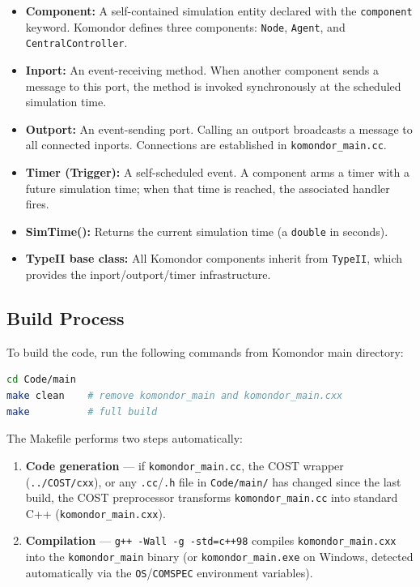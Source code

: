 \documentclass[11pt,a4paper]{article}
\begin{document}
\begin{itemize}
    \item \textbf{Component:} A self-contained simulation entity declared with the \texttt{component} keyword.  Komondor defines three components: \texttt{Node}, \texttt{Agent}, and \texttt{CentralController}.
    \item \textbf{Inport:} An event-receiving method.  When another component sends a message to this port, the method is invoked synchronously at the scheduled simulation time.
    \item \textbf{Outport:} An event-sending port.  Calling an outport broadcasts a message to all connected inports.  Connections are established in \texttt{komondor\_main.cc}.
    \item \textbf{Timer (Trigger):} A self-scheduled event.  A component arms a timer with a future simulation time; when that time is reached, the associated handler fires.
    \item \textbf{SimTime():} Returns the current simulation time (a \texttt{double} in seconds).
    \item \textbf{TypeII base class:} All Komondor components inherit from \texttt{TypeII}, which provides the inport/outport/timer infrastructure.
\end{itemize}
 
\subsection{Build Process}

To build the code, run the following commands from Komondor main directory:

\begin{lstlisting}[language=bash,caption={Build steps with Makefile (Linux only)}]
cd Code/main
make clean    # remove komondor_main and komondor_main.cxx
make          # full build
\end{lstlisting}

The Makefile performs two steps automatically:

\begin{enumerate}
    \item \textbf{Code generation} --- if \texttt{komondor\_main.cc}, the COST wrapper (\texttt{../COST/cxx}), or any \texttt{.cc}/\texttt{.h} file in \texttt{Code/main/} has changed since the last build, the COST preprocessor transforms \texttt{komondor\_main.cc} into standard C++ (\texttt{komondor\_main.cxx}).
    \item \textbf{Compilation} --- \texttt{g++ -Wall -g -std=c++98} compiles \texttt{komondor\_main.cxx} into the \texttt{komondor\_main} binary (or \texttt{komondor\_main.exe} on Windows, detected automatically via the \texttt{OS}/\texttt{COMSPEC} environment variables).
\end{enumerate}
\end{document}
